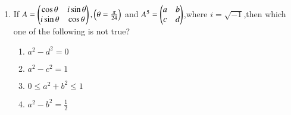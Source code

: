 \documentclass[journal,12pt,twocolumn]{IEEEtran}
\theoremstyle{remark}
\begin{document}
\begin{enumerate}
\item If $A=\begin{pmatrix}\cos\theta&i\sin\theta\\i\sin\theta&\cos\theta\end{pmatrix},\left(\theta=\frac{\pi}{24}\right)$ and $A^5=\begin{pmatrix}a&b\\c&d\end{pmatrix}$,where $i=\sqrt{-1}$,then which one of the following is not true?
\begin{multicols}{2}
\begin{enumerate}
    \item $a^2-d^2=0$
    \item $a^2-c^2=1$
    \item $0\leq a^2+b^2\leq1$
    \item $a^2-b^2=\frac{1}{2}$
\end{enumerate}
\end{multicols}
\end{enumerate}
\end{document}
